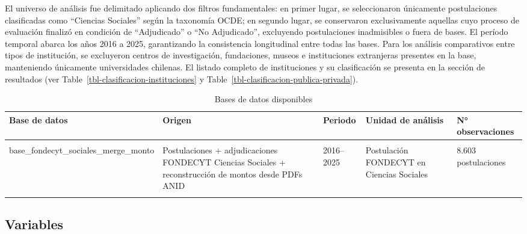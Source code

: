 \documentclass[
  12pt,
  letterpaper,
]{article}
\begin{document}
El universo de análisis fue delimitado aplicando dos filtros
fundamentales: en primer lugar, se seleccionaron únicamente
postulaciones clasificadas como ``Ciencias Sociales'' según la taxonomía
OCDE; en segundo lugar, se conservaron exclusivamente aquellas cuyo
proceso de evaluación finalizó en condición de ``Adjudicado'' o ``No
Adjudicado'', excluyendo postulaciones inadmisibles o fuera de bases. El
período temporal abarca los años 2016 a 2025, garantizando la
consistencia longitudinal entre todas las bases. Para los análisis
comparativos entre tipos de institución, se excluyeron centros de
investigación, fundaciones, museos e instituciones extranjeras presentes
en la base, manteniendo únicamente universidades chilenas. El listado
completo de instituciones y su clasificación se presenta en la sección
de resultados (ver Table~\ref{tbl-clasificacion-instituciones} y
Table~\ref{tbl-clasificacion-publica-privada}).

\begingroup\fontsize{9}{11}\selectfont

\begin{longtable}[t]{lllll}

\caption{\label{tbl-bbdd}Bases de datos disponibles}

\tabularnewline

\toprule
Base de datos & Origen & Periodo & Unidad de análisis & N° observaciones\\
\midrule
\cellcolor{gray!10}{base\_fondecyt\_completa} & \cellcolor{gray!10}{Merge postulaciones + adjudicaciones FONDECYT} & \cellcolor{gray!10}{2016–2025} & \cellcolor{gray!10}{Postulación FONDECYT (todas las áreas)} & \cellcolor{gray!10}{Por confirmar con tu base}\\
base\_fondecyt\_sociales\_merge\_monto & Postulaciones + adjudicaciones FONDECYT Ciencias Sociales + reconstrucción de montos desde PDFs ANID & 2016–2025 & Postulación FONDECYT en Ciencias Sociales & 8.603 postulaciones\\
\cellcolor{gray!10}{adjudicacion\_milenio\_limpia\_sociales} & \cellcolor{gray!10}{Adjudicaciones Milenio en Ciencias Sociales} & \cellcolor{gray!10}{2016, 2017, 2020, 2021, 2022} & \cellcolor{gray!10}{Adjudicación Núcleo/Instituto Milenio} & \cellcolor{gray!10}{59 adjudicaciones (26 en CS Sociales)}\\
\bottomrule

\end{longtable}

\endgroup{}

\subsection{Variables}\label{variables}
\end{document}
